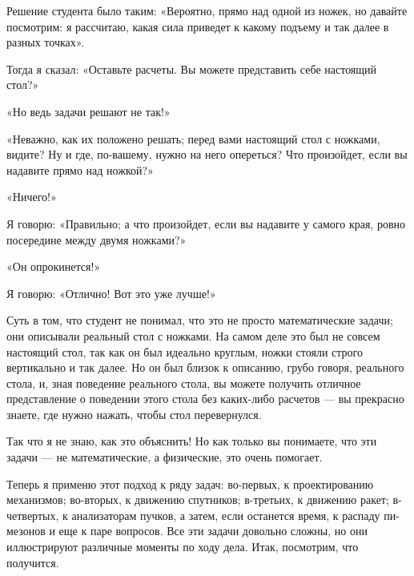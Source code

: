 \documentclass[10pt,oneside]{article}
\newcommand{\TipsSubsection}[1]{\par\vspace{6bp}{\normalsize\bfseries #1\par}\vspace{2bp}}
\begin{document}
Решение студента было таким: «Вероятно, прямо над одной из ножек, но давайте посмотрим: я рассчитаю, какая сила приведет к какому подъему и так далее в разных точках».\par

Тогда я сказал: «Оставьте расчеты. Вы можете представить себе настоящий стол?»\par

«Но ведь задачи решают не так!»\par

«Неважно, как их положено решать; перед вами настоящий стол с ножками, видите? Ну и где, по-вашему, нужно на него опереться? Что произойдет, если вы надавите прямо над ножкой?»\par

«Ничего!»\par

Я говорю: «Правильно; а что произойдет, если вы надавите у самого края, ровно посередине между двумя ножками?»\par

«Он опрокинется!»\par

Я говорю: «Отлично! Вот это уже лучше!»\par

Суть в том, что студент не понимал, что это не просто математические задачи; они описывали реальный стол с ножками. На самом деле это был не совсем настоящий стол, так как он был идеально круглым, ножки стояли строго вертикально и так далее. Но он был близок к описанию, грубо говоря, реального стола, и, зная поведение реального стола, вы можете получить отличное представление о поведении этого стола без каких-либо расчетов --- вы прекрасно знаете, где нужно нажать, чтобы стол перевернулся.\par

Так что я не знаю, как это объяснить! Но как только вы понимаете, что эти задачи --- не математические, а физические, это очень помогает.\par

Теперь я применю этот подход к ряду задач: во-первых, к проектированию механизмов; во-вторых, к движению спутников; в-третьих, к движению ракет; в-четвертых, к анализаторам пучков, а затем, если останется время, к распаду пи-мезонов и еще к паре вопросов. Все эти задачи довольно сложны, но они иллюстрируют различные моменты по ходу дела. Итак, посмотрим, что получится.\par

\TipsSubsection{2-7 Задача из области проектирования механизмов}
\end{document}
